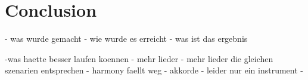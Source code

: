 \section{Conclusion}
\label{conc}

- was wurde gemacht 
- wie wurde es erreicht
- was ist das ergebnis 

-was haette besser laufen koennen
  - mehr lieder
  - mehr lieder die gleichen szenarien entsprechen
  - harmony faellt weg
  - akkorde 
  - leider nur ein instrument
  - 



%
%


